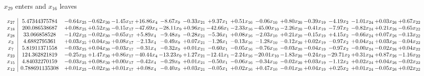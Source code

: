 \documentclass[9pt]{article}
\begin{document}
 $ x_{29} $ enters and $ x_{16} $ leaves 

 \[\begin{array}{c| c c@{\hskip 2pt} c@{\hskip 2pt} c@{\hskip 2pt} c@{\hskip 2pt} c@{\hskip 2pt} c@{\hskip 2pt} c@{\hskip 2pt} c@{\hskip 2pt} c@{\hskip 2pt} c@{\hskip 2pt} c@{\hskip 2pt} c@{\hskip 2pt} c@{\hskip 2pt} c@{\hskip 2pt} c@{\hskip 2pt} }
 x_{27}   &  5.47344375784 & -0.64 x_{25} & -0.62 x_{30} & -1.45 x_{17} & + 16.86 x_{4} & -8.67 x_{9} & -0.33 x_{21} & +  9.37 x_{1} & +  0.51 x_{16} & -0.06 x_{10} & +  0.80 x_{20} & -0.39 x_{19} & -4.19 x_{2} & -1.01 x_{24} & +  0.03 x_{26} & +  0.67 x_{22}\\
 x_{18}   &  200.086538687 & +  0.08 x_{25} & +  0.52 x_{30} & -0.15 x_{17} & -47.69 x_{4} & -28.11 x_{9} & +  0.96 x_{21} & -42.66 x_{1} & -2.33 x_{16} & -45.00 x_{10} & -2.26 x_{20} & -0.41 x_{19} & -7.97 x_{2} & -0.82 x_{24} & +  0.21 x_{26} & -0.65 x_{22}\\
 x_{28}   &  33.066858528 & -1.02 x_{25} & -0.02 x_{30} & -0.65 x_{17} & +  5.89 x_{4} & -9.48 x_{9} & -0.28 x_{21} & -5.36 x_{1} & +  0.08 x_{16} & -2.03 x_{10} & +  0.21 x_{20} & -0.15 x_{19} & +  4.15 x_{2} & -0.66 x_{24} & +  0.07 x_{26} & -0.13 x_{22}\\
 x_{3}   &  4.6882795361 & +  0.03 x_{25} & +  0.04 x_{30} & +  0.08 x_{17} & -2.13 x_{4} & -0.49 x_{9} & +  0.07 x_{21} & -1.26 x_{1} & -0.13 x_{16} & -1.28 x_{10} & -0.12 x_{20} & +  0.02 x_{19} & -0.97 x_{2} & +  0.04 x_{24} & +  0.03 x_{26} & -0.04 x_{22}\\
 x_{7}   &  5.81911371558 & -0.03 x_{25} & +  0.04 x_{30} & -0.03 x_{17} & -0.31 x_{4} & -0.32 x_{9} & +  0.01 x_{21} & -0.60 x_{1} & -0.05 x_{16} & -0.76 x_{10} & -0.03 x_{20} & -0.04 x_{19} & -0.97 x_{2} & -0.00 x_{24} & -0.02 x_{26} & +  0.04 x_{22}\\
 x_{23}   &  124.362821819 & -0.25 x_{25} & +  1.47 x_{30} & +  0.86 x_{17} & -40.44 x_{4} & -13.23 x_{9} & +  1.27 x_{21} & -12.41 x_{1} & -2.24 x_{16} & -20.01 x_{10} & -1.83 x_{20} & -0.24 x_{19} & -29.71 x_{2} & +  0.31 x_{24} & +  0.87 x_{26} & -1.16 x_{22}\\
 x_{15}   &  4.84032270159 & -0.03 x_{25} & +  0.08 x_{30} & +  0.00 x_{17} & -0.42 x_{4} & -0.29 x_{9} & +  0.01 x_{21} & -0.50 x_{1} & -0.06 x_{16} & -0.34 x_{10} & -0.02 x_{20} & +  0.03 x_{19} & -1.12 x_{2} & +  0.02 x_{24} & +  0.04 x_{26} & -0.02 x_{22}\\
 x_{12}   &  0.788691135308 & +  0.01 x_{25} & -0.02 x_{30} & +  0.01 x_{17} & +  0.08 x_{4} & -0.40 x_{9} & +  0.03 x_{21} & -0.05 x_{1} & +  0.02 x_{16} & +  0.47 x_{10} & -0.01 x_{20} & +  0.04 x_{19} & +  0.25 x_{2} & +  0.01 x_{24} & -0.05 x_{26} & +  0.02 x_{22}\\

\end{array}\]
\end{document}
